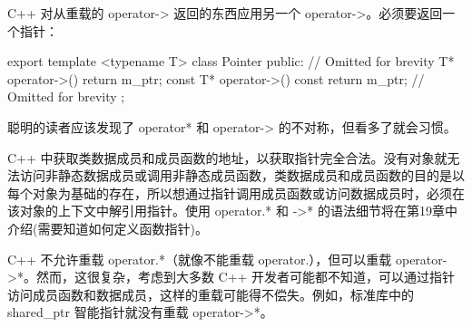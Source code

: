 C++ 对从重载的 operator-> 返回的东西应用另一个 operator->。必须要返回一个指针：

\begin{cpp}
export template <typename T> class Pointer
{
    public:
        // Omitted for brevity
        T* operator->() { return m_ptr; }
        const T* operator->() const { return m_ptr; }
        // Omitted for brevity
};
\end{cpp}

聪明的读者应该发现了 operator* 和 operator-> 的不对称，但看多了就会习惯。


C++ 中获取类数据成员和成员函数的地址，以获取指针完全合法。没有对象就无法访问非静态数据成员或调用非静态成员函数，类数据成员和成员函数的目的是以每个对象为基础的存在，所以想通过指针调用成员函数或访问数据成员时，必须在该对象的上下文中解引用指针。使用 operator.* 和 ->* 的语法细节将在第19章中介绍(需要知道如何定义函数指针)。

C++ 不允许重载 operator.*（就像不能重载 operator.），但可以重载 operator->*。然而，这很复杂，考虑到大多数 C++ 开发者可能都不知道，可以通过指针访问成员函数和数据成员，这样的重载可能得不偿失。例如，标准库中的 shared\_ptr 智能指针就没有重载 operator->*。





















